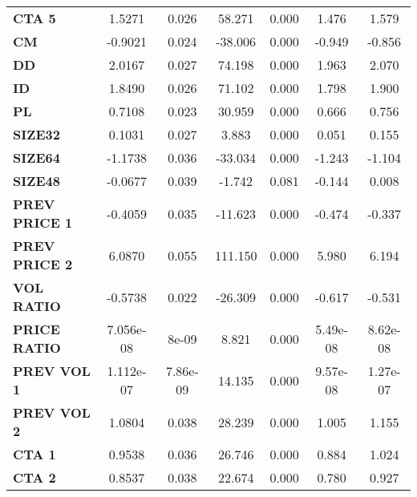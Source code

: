 \documentclass{article}
\begin{document}
\begin{center}
\begin{tabular}{lcccccc}
\textbf{CTA 5}    &       1.5271  &        0.026     &    58.271  &         0.000        &        1.476    &        1.579     \\
\textbf{CM}    &      -0.9021  &        0.024     &   -38.006  &         0.000        &       -0.949    &       -0.856     \\
\textbf{DD}    &       2.0167  &        0.027     &    74.198  &         0.000        &        1.963    &        2.070     \\
\textbf{ID}    &       1.8490  &        0.026     &    71.102  &         0.000        &        1.798    &        1.900     \\
\textbf{PL}    &       0.7108  &        0.023     &    30.959  &         0.000        &        0.666    &        0.756     \\
\textbf{SIZE32}   &       0.1031  &        0.027     &     3.883  &         0.000        &        0.051    &        0.155     \\
\textbf{SIZE64}   &      -1.1738  &        0.036     &   -33.034  &         0.000        &       -1.243    &       -1.104     \\
\textbf{SIZE48}   &      -0.0677  &        0.039     &    -1.742  &         0.081        &       -0.144    &        0.008     \\
\textbf{PREV PRICE 1}   &      -0.4059  &        0.035     &   -11.623  &         0.000        &       -0.474    &       -0.337     \\
\textbf{PREV PRICE 2}   &       6.0870  &        0.055     &   111.150  &         0.000        &        5.980    &        6.194     \\
\textbf{VOL RATIO}   &      -0.5738  &        0.022     &   -26.309  &         0.000        &       -0.617    &       -0.531     \\
\textbf{PRICE RATIO}   &    7.056e-08  &        8e-09     &     8.821  &         0.000        &     5.49e-08    &     8.62e-08     \\
\textbf{PREV VOL 1}   &    1.112e-07  &     7.86e-09     &    14.135  &         0.000        &     9.57e-08    &     1.27e-07     \\
\textbf{PREV VOL 2}   &       1.0804  &        0.038     &    28.239  &         0.000        &        1.005    &        1.155     \\
\textbf{CTA 1}   &       0.9538  &        0.036     &    26.746  &         0.000        &        0.884    &        1.024     \\
\textbf{CTA 2}   &       0.8537  &        0.038     &    22.674  &         0.000        &        0.780    &        0.927     \\

\end{tabular}
\end{center}
\end{document}

